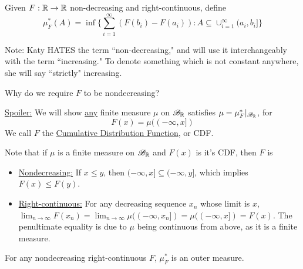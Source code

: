 \documentclass[x11names,reqno,14pt]{extarticle}
\newcommand*{\oo}{\infty}
\newcommand{\seq}[1]{_{#1 = 1}^\oo}
\begin{document}

Given $F:\mathbb{R}\to\mathbb{R}$ non-decreasing and right-continuous, define
\[
\mu_F^*(A) = \inf\{\sum\seq{i}(F(b_i)-F(a_i)):A\subseteq\cup\seq{i}(a_i, b_i]\}
\]

Note: Katy HATES the term ``non-decreasing," and will use it interchangeably with the term ``increasing." To denote something which is not constant anywhere, she will say ``strictly" increasing. 

Why do we require $F$ to be nondecreasing?

\underline{Spoiler:} We will show \underline{any} finite measure $\mu$ on $\mathscr{B}_{\mathbb{R}}$ satisfies $\mu = \mu^*_F|_{\mathscr{B}_{\mathbb{R}}}$, for 
\[
F(x) = \mu((-\oo, x])
\]
We call $F$ the \underline{Cumulative Distribution Function}, or CDF. 

Note that if $\mu$ is a finite measure on $\mathscr{B}_{\mathbb{R}}$ and $F(x)$ is it's CDF, then $F$ is 
\begin{itemize}
\item \underline{Nondecreasing:} If $x\leq y$, then $(-\oo, x] \subseteq (-\oo, y]$, which implies $F(x)\leq F(y)$. 
\item \underline{Right-continuous:} For any decreasing sequence $x_n$ whose limit is $x$, $\lim_{n\to\oo}F(x_n) = \lim_{n\to\oo}\mu((-\oo, x_n]) = \mu((-\oo, x]) = F(x)$. The penultimate equality is due to $\mu$ being continuous from above, as it is a finite measure. 
\end{itemize}

\thm For any nondecreasing right-continuous $F$, $\mu^*_F$ is an outer measure. 

\proof
\end{document}

